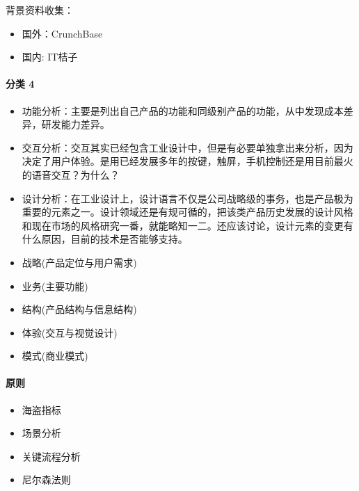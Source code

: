 \documentclass[letterpaper,11pt,english]{sphinxmanual}
\begin{document}
背景资料收集：
\begin{itemize}
\item {} 
国外：CrunchBase

\item {} 
国内: IT桔子

\end{itemize}


\paragraph{分类 4\sphinxfootnotemark[449]}
\label{\detokenize{chapter_knowledge/goods_analysis:id6}}%
\begin{footnotetext}[449]\sphinxAtStartFootnote
{}
%
\end{footnotetext}\ignorespaces \begin{itemize}
\item {} 
功能分析：主要是列出自己产品的功能和同级别产品的功能，从中发现成本差异，研发能力差异。

\item {} 
交互分析：交互其实已经包含工业设计中，但是有必要单独拿出来分析，因为决定了用户体验。是用已经发展多年的按键，触屏，手机控制还是用目前最火的语音交互？为什么？

\item {} 
设计分析：在工业设计上，设计语言不仅是公司战略级的事务，也是产品极为重要的元素之一。设计领域还是有规可循的，把该类产品历史发展的设计风格和现在市场的风格研究一番，就能略知一二。还应该讨论，设计元素的变更有什么原因，目前的技术是否能够支持。

\item {} 
战略(产品定位与用户需求)

\item {} 
业务(主要功能)

\item {} 
结构(产品结构与信息结构)

\item {} 
体验(交互与视觉设计)

\item {} 
模式(商业模式)%
\begin{footnote}[450]\sphinxAtStartFootnote
{}
%
\end{footnote}

\end{itemize}


\paragraph{原则}
\label{\detokenize{chapter_knowledge/goods_analysis:id7}}\begin{itemize}
\item {} 
海盗指标

\item {} 
场景分析

\item {} 
关键流程分析

\item {} 
尼尔森法则

\end{itemize}
\end{document}
